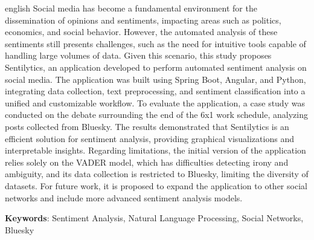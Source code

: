 \documentclass[
	12pt,				%
	oneside,			%
	a4paper,			%
	english,			%
	french,				%
	spanish,			%
	brazil				%
	]{abntex2}
\newcommand{\listofquadrosname}{Lista de quadros}
\newcommand{\listasdousuario}{}
\begin{document}
\begin{resumo}[Abstract]
 \begin{otherlanguage*}{english}
   Social media has become a fundamental environment for the dissemination
   of opinions and sentiments, impacting areas such as politics, economics,
   and social behavior. However, the automated analysis of these sentiments
   still presents challenges, such as the need for intuitive tools capable
   of handling large volumes of data. Given this scenario, this study
   proposes Sentilytics, an application developed to perform automated
   sentiment analysis on social media. The application was built using
   Spring Boot, Angular, and Python, integrating data collection, text
   preprocessing, and sentiment classification into a unified and
   customizable workflow. To evaluate the application, a case study was
   conducted on the debate surrounding the end of the 6x1 work schedule,
   analyzing posts collected from Bluesky. The results demonstrated that
   Sentilytics is an efficient solution for sentiment analysis, providing
   graphical visualizations and interpretable insights. Regarding
   limitations, the initial version of the application relies solely on the
   VADER model, which has difficulties detecting irony and ambiguity, and
   its data collection is restricted to Bluesky, limiting the diversity of
   datasets. For future work, it is proposed to expand the application to
   other social networks and include more advanced sentiment analysis
   models.

   \vspace{\onelineskip}
 
   \noindent 
   \textbf{Keywords}: Sentiment Analysis, Natural Language Processing, Social Networks,
Bluesky
 \end{otherlanguage*}
\end{resumo}



\listoffigures*
\cleardoublepage


\pdfbookmark[0]{\listofquadrosname}{loq}
\listofquadros*
\cleardoublepage

\listasdousuario
\end{document}
